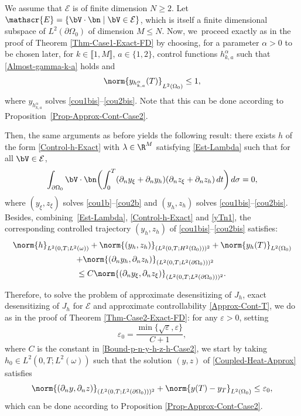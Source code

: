 We assume that $\mathcal{E}$ is of finite dimension $N\geqslant 2$.
Let $\mathscr{E} = \{ \bV\cdot \bn\mid \bV \in \mathcal{E}\}$, which is itself a finite dimensional subspace of $L^2(\partial\Omega_0)$ of dimension $M\leqslant N$. Now, we~proceed exactly as in the proof of Theorem \ref{Thm-Case1-Exact-FD} by choosing, {for a parameter $\alpha>0$ to be chosen later, }for $k \in \llbracket 1,M \rrbracket $, $a \in \{1,2\}$, control functions $h_{k,a}^\alpha$ such that \eqref{Almost-gamma-k-a} holds and
\begin{equation}\label{yTn1}
\norm{y_{h_{k,a}^\alpha}(T)}_{L^2(\Omega_0)} \leq 1,
\end{equation}
{where $y_{h_{k,a}^\alpha}$ solves \eqref{cou1bis}--\eqref{cou2bis}. Note that this can be done according to Proposition~\ref{Prop-Approx-Cont-Case2}.}

Then, the same arguments as before yields the following result: there exists {$h$ of the form \eqref{Control-h-Exact} with $\lambda \in \R^M$ satisfying \eqref{Est-Lambda}} such that for all $\bV \in \mathcal{E}$,\vspace*{-3pt}
\[
\int_{\partial \Omega_0} \bV \cdot \bn \biggl(\int_0^T (\partial_n y_\xi + \partial_n y_h) (\partial_n z_\xi + \partial_n z_h) \, dt \biggr)\, d\sigma = 0,
\]
where $(y_\xi, z_\xi)$ solves \eqref{cou1b}--\eqref{cou2b} and $(y_h,z_h)$ solves \eqref{cou1bis}--\eqref{cou2bis}. Besides, combining~\eqref{Est-Lambda}, \eqref{Control-h-Exact} and \eqref{yTn1}, the corresponding controlled trajectory $(y_h,z_h)$ of \eqref{cou1bis}--\eqref{cou2bis} satisfies:\vspace*{-3pt}
\begin{multline}
\label{Bound-p-n-y-h-z-h-Case2}
\norm{h}_{L^2(0,T; L^2(\omega))}
+
\norm{(y_h,z_h)}_{(L^2(0,T; H^2(\Omega_0)))^2}
+
\norm{y_h(T)}_{L^2(\Omega_0)}\\
\hspace*{-6mm}+
\norm{(\partial_n y_h, \partial_n z_h)}_{(L^2(0,T; L^2(\partial \Omega_0)))^2}
\\
\leq
C \norm{(\partial_n y_\xi, \partial_n z_\xi)}_{(L^2(0,T; L^2(\partial \Omega_0)))^2}.
\end{multline}

Therefore, to solve the problem of approximate desensitizing of $J_h$, exact desensitizing of $J_h$ for $\mathcal{E}$ and approximate controllability \eqref{Approx-Cont-T}, we do as in the proof of Theorem \ref{Thm-Case2-Exact-FD}: for any $\varepsilon>0$, setting\vspace*{-3pt}
\[
\varepsilon_0 = {\frac{\min\{\sqrt{\varepsilon}, \varepsilon\}}{C + 1},}
\]
where $C$ is the constant in \eqref{Bound-p-n-y-h-z-h-Case2},
we start by taking $h_0 \in L^2(0,T; L^2(\omega))$ such that the solution $(y,z)$ of \eqref{Coupled-Heat-Approx} satisfies
\[
\norm{(\partial_n y, \partial_n z)}_{(L^2(0,T; L^2(\partial \Omega_0)))^2}
+ \norm{y(T) - y_T}_{L^2(\Omega_0)}
\leq \varepsilon_0,
\]
which can be done according to Proposition \ref{Prop-Approx-Cont-Case2}.

